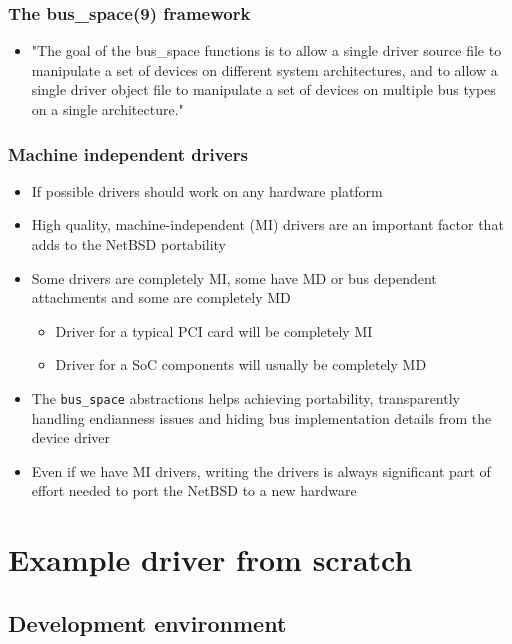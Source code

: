 \documentclass[dvipsnames,table]{beamer}
\begin{document}
\begin{frame}
\frametitle{The bus\_space(9) framework}
\begin{itemize}
	\item "The goal of the bus\_space functions is to allow a single
     driver source file to manipulate a set of devices on different system
     architectures, and to allow a single driver object file to manipulate a
     set of devices on multiple bus types on a single architecture."
\end{itemize}
\end{frame}

\begin{frame}
\frametitle{Machine independent drivers}

\begin{itemize}
	\item If possible drivers should work on any hardware platform
	\item High quality, machine-independent (MI) drivers are an important factor that adds to the NetBSD portability
	\item Some drivers are completely MI, some have MD or bus dependent attachments and some are completely MD
	\begin{itemize}
		\item Driver for a typical PCI card will be completely MI
		\item Driver for a SoC components will usually be completely MD
	\end{itemize}
	\item The {\tt bus\_space} abstractions helps achieving portability, transparently handling endianness issues and hiding bus implementation details from the device driver
	\item Even if we have MI drivers, writing the drivers is always significant part of effort needed to port the NetBSD to a new hardware
\end{itemize}
\end{frame}


\section{Example driver from scratch}

\subsection{Development environment}
\end{document}
